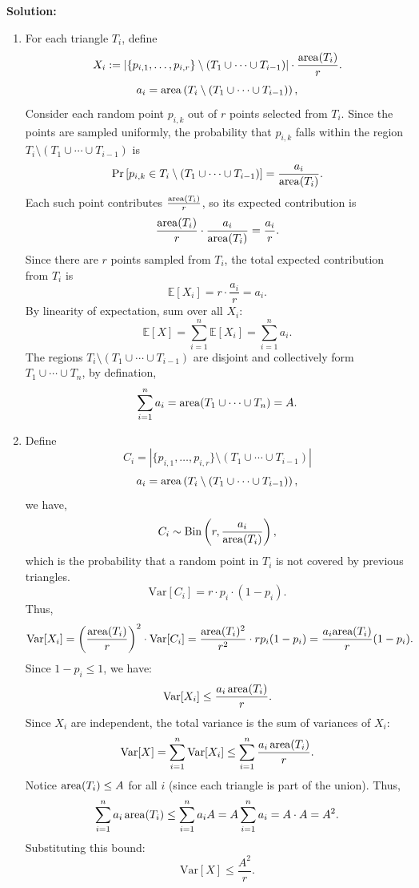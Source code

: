 \documentclass[11pt]{article}
\newcommand{\Var}{\textrm{Var}}
\begin{document}
\begin{description}
\newpage
\textbf{Solution:}
\begin{enumerate}
  \item[(a)]
    For each triangle \( T_i \), define 
    \[
      X_i := \left|\{p_{i,1},\ldots,p_{i,r}\}\setminus (T_1\cup\cdots\cup T_{i-1})\right|
      \cdot \frac{\mathop{\rm area}(T_i)}{r}.
    \]
    \[
    a_i = \mathop{\rm area}\left(T_i\setminus (T_1\cup\cdots\cup T_{i-1})\right),
    \]
    Consider each random point \( p_{i,k} \) out of \( r \) points selected from \( T_i \). 
    Since the points are sampled uniformly, 
    the probability that \( p_{i,k} \) falls within the region 
    \( T_i\setminus (T_1\cup\cdots\cup T_{i-1}) \) is  
    \[
    \Pr\left[p_{i,k}\in T_i\setminus (T_1\cup\cdots\cup T_{i-1})\right] 
    = \frac{a_i}{\mathop{\rm area}(T_i)}.
    \]
    Each such point contributes \( \frac{\mathop{\rm area}(T_i)}{r} \), so its expected contribution is  
    \[
    \frac{\mathop{\rm area}(T_i)}{r} \cdot \frac{a_i}{\mathop{\rm area}(T_i)} = \frac{a_i}{r}.
    \]
    Since there are \( r \) points sampled from \( T_i \), 
    the total expected contribution from \( T_i \) is  
    \[
    \mathbb{E}[X_i] = r\cdot \frac{a_i}{r} = a_i.
    \]
    By linearity of expectation, sum over all \( X_i \):
    \[
    \mathbb{E}[X] = \sum_{i=1}^n \mathbb{E}[X_i] = \sum_{i=1}^n a_i.
    \]
    The regions \( T_i\setminus (T_1\cup\cdots\cup T_{i-1}) \) 
    are disjoint and collectively form \( T_1\cup\cdots\cup T_n \), 
    by defination,
    \[
    \sum_{i=1}^n a_i = \mathop{\rm area}(T_1\cup\cdots\cup T_n) = A.
    \]

  \item[(b)]
    Define
    \[
    C_i = \left|\{p_{i,1},\ldots,p_{i,r}\}\setminus (T_1\cup\cdots\cup T_{i-1})\right|
    \]
    \[
    a_i = \mathop{\rm area}\left(T_i\setminus (T_1\cup\cdots\cup T_{i-1})\right),
    \]
    we have,
    \[
    C_i \sim \operatorname{Bin}\left(r, \frac{a_i}{\mathop{\rm area}(T_i)}\right),
    \]
    which is the probability that a random point in \(T_i\) is not covered by previous triangles.
    \[
    \Var[C_i] = r\cdot p_i\cdot (1 - p_i).
    \] Thus,
    \[
    \Var[X_i] = \left(\frac{\AREA(T_i)}{r}\right)^2 \cdot 
    \Var[C_i] = \frac{\AREA(T_i)^2}{r^2} \cdot r p_i (1 - p_i) = \frac{a_i \text{area}(T_i)}{r} (1 - p_i).
    \]
    Since \(1 - p_i \le 1\), we have:
    \[
    \Var[X_i] \le \frac{a_i \AREA(T_i)}{r}.
    \]
    Since \(X_i\) are independent, the total variance is the sum of variances of \(X_i\):
    \[
    \Var[X] = \sum_{i=1}^n \Var[X_i] \le \sum_{i=1}^n \frac{a_i \AREA(T_i)}{r}.
    \]
    Notice \(\mathop{\rm area}(T_i) \le A\) for all \(i\) (since each triangle is part of the union). Thus,
    \[
    \sum_{i=1}^n a_i \mathop{\rm area}(T_i) \le \sum_{i=1}^n a_i A = A \sum_{i=1}^n a_i = A \cdot A = A^2.
    \]
    Substituting this bound:
    \[
    \Var[X] \le \frac{A^2}{r}.
    \]


\end{enumerate}
\end{description}
\end{document}

